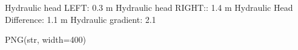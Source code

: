\documentclass[letterpaper,10pt,english]{sphinxmanual}
\begin{document}
\begin{sphinxVerbatim}[commandchars=\\\{\}]
Hydraulic head LEFT: 0.3 m
Hydraulic head RIGHT:: 1.4 m
Hydraulic Head Difference: 1.1 m
Hydraulic gradient: 2.1
\end{sphinxVerbatim}

\begin{sphinxVerbatim}[commandchars=\\\{\}]
   
\end{sphinxVerbatim}

\begin{sphinxVerbatim}[commandchars=\\\{\}]
PNG(str, width=400)
\end{sphinxVerbatim}
\end{document}
